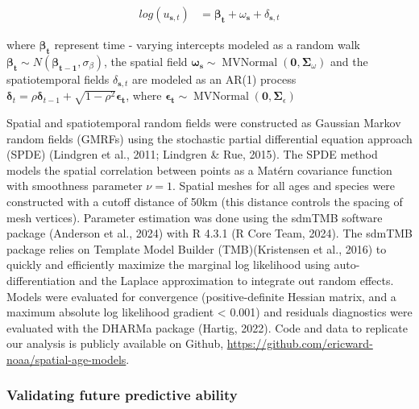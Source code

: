 \documentclass[
]{article}
\begin{document}
\[
\begin{aligned}
log \left( u_{\boldsymbol{s},t} \right) &= \boldsymbol{\beta_{t}} + \omega_{\boldsymbol{s}} + \delta_{\boldsymbol{s},t}
\end{aligned}
\]

where \(\boldsymbol{\beta_{t}}\) represent time - varying intercepts
modeled as a random walk
\(\boldsymbol{\beta_{t}} \sim N \left( \boldsymbol{\beta_{t-1}}, \sigma_\beta \right)\),
the spatial field
\(\boldsymbol{\omega_{s}} \sim \operatorname{MVNormal} \left( \boldsymbol{0}, \boldsymbol{\Sigma}_\omega \right)\)
and the spatiotemporal fields \(\delta_{\boldsymbol{s},t}\) are modeled
as an AR(1) process
\(\boldsymbol{\delta}_{t} = \rho \boldsymbol{\delta}_{t-1} + \sqrt{1 - \rho^2} \boldsymbol{\epsilon_{t}}\),
where
\(\boldsymbol{\epsilon_{t}} \sim \operatorname{MVNormal} \left(\boldsymbol{0}, \boldsymbol{\Sigma}_{\epsilon} \right)\)

Spatial and spatiotemporal random fields were constructed as Gaussian
Markov random fields (GMRFs) using the stochastic partial differential
equation approach (SPDE) (Lindgren et al., 2011; Lindgren \& Rue, 2015).
The SPDE method models the spatial correlation between points as a
Matérn covariance function with smoothness parameter \(\nu = 1\).
Spatial meshes for all ages and species were constructed with a cutoff
distance of 50km (this distance controls the spacing of mesh vertices).
Parameter estimation was done using the sdmTMB software package
(Anderson et al., 2024) with R 4.3.1 (R Core Team, 2024). The sdmTMB
package relies on Template Model Builder (TMB)(Kristensen et al., 2016)
to quickly and efficiently maximize the marginal log likelihood using
auto-differentiation and the Laplace approximation to integrate out
random effects. Models were evaluated for convergence (positive-definite
Hessian matrix, and a maximum absolute log likelihood gradient
\textless{} 0.001) and residuals diagnostics were evaluated with the
DHARMa package (Hartig, 2022). Code and data to replicate our analysis
is publicly available on Github,
\url{https://github.com/ericward-noaa/spatial-age-models}.

\hypertarget{validating-future-predictive-ability}{%
\subsubsection{Validating future predictive
ability}\label{validating-future-predictive-ability}}
\end{document}
